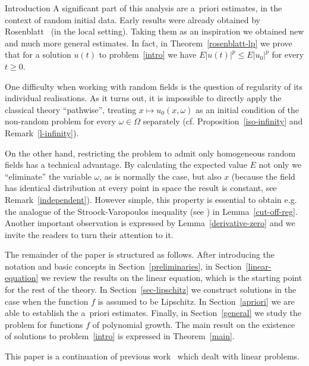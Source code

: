 \documentclass[a4paper,10pt,fleqn]{amsart}
\theoremstyle{remark}
\theoremstyle{definition}
\renewcommand{\=} {\overset{d}{=}}
\begin{document}
\begin{section}{Introduction}
   A significant part of this analysis are a~priori estimates, in the context of random initial data. Early results
   were already obtained by Rosenblatt~\cite{MR0264252} (in the local setting).
   Taking them as an inspiration we obtained new and much more general estimates.
   In fact, in Theorem~\ref{rosenblatt-lp} we prove that for a solution $u(t)$
   to problem~\eqref{intro} we have $E|u(t)|^p \leq E|u_0|^p$ for every $t\geq 0$.
   
   One difficulty when working with random fields is the question of regularity of its individual realisations.
   As it turns out, it is impossible to directly apply the classical theory ``pathwise'', treating $x\mapsto u_0(x,\omega)$
   as an initial condition of the non-random problem for every $\omega\in\Omega$ separately (cf. Proposition~\ref{iso-infinity} and Remark~\ref{l-infinity}).
   
   On the other hand, restricting the problem to admit only homogeneous random fields has a technical
   advantage. 
   By calculating the expected value $E$ not only we ``eliminate'' the variable $\omega$,
   as is normally the case, but also $x$ (because the field has identical distribution
   at every point in space the result is constant, see Remark~\ref{independent}).
   However simple, this property is essential to obtain e.g. the analogue of the Stroock-Varopoulos 
   inequality (see \cite{MR1218884,MR1409835}) in Lemma~\ref{cut-off-reg}.
   Another important observation is expressed by Lemma~\ref{derivative-zero} and we invite the readers to turn their attention to it.
   
   The remainder of the paper is structured as follows. After introducing the notation and basic concepts in Section~\ref{preliminaries}, in Section~\ref{linear-equation} we review the 
   results on the linear equation, which is the starting point for the rest of the theory. In Section~\ref{sec-lipschitz} we construct solutions in the case when the function $f$ is assumed to be Lipschitz. In Section~\ref{apriori} we 
   are able to establish the a~priori estimates. 
   Finally, in Section~\ref{general} we study the problem for functions $f$ of polynomial growth.
   The main result on the existence of solutions to problem~\eqref{intro} is expressed
   in Theorem~\ref{main}.
   
   This paper is a continuation of previous work~\cite{MR3628179} which dealt with linear problems.
  \end{section}
\end{document}
